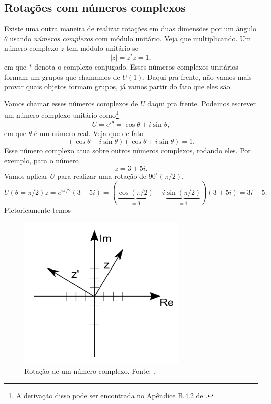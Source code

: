 \documentclass{article}
\numberwithin{equation}{section}
\numberwithin{figure}{section}
\begin{document}
\subsection{Rotações com números complexos}
Existe uma outra maneira de realizar rotações em duas dimensões por um ângulo $\theta$ usando \textit{números complexos} com módulo unitário. Veja que multiplicando. Um número complexo $z$ tem módulo unitário se 
\begin{equation}
	|z|=z^*z=1,
\end{equation}
em que $*$ denota o complexo conjugado. Esses números complexos unitários formam um grupos que chamamos de $U(1)$. Daqui pra frente, não vamos mais provar quais objetos formam grupos, já vamos partir do fato que eles são. 

Vamos chamar esses números complexos de $U$ daqui pra frente. Podemos escrever um número complexo unitário como\footnote{A derivação disso pode ser encontrada no Apêndice B.4.2 de \cite{jakob}.}
\begin{equation}
	U=e^{i\theta}=\cos\theta+i\sin\theta, 
\end{equation}
em que $\theta$ é um número real. Veja que de fato
\begin{equation}
	(\cos\theta-i\sin\theta)(\cos\theta+i\sin\theta)=1.
\end{equation}
Esse número complexo atua sobre outros números complexos, rodando eles. Por exemplo, para o número 
\begin{equation*}
	z=3+5i. 
\end{equation*}
Vamos aplicar $U$ para realizar uma rotação de $90^{\circ}(\pi/2)$, 
\begin{equation}
	U(\theta=\pi/2)z=e^{i\pi/2}(3+5i)=(\underbrace{\cos(\pi/2)}_{=0}+i\underbrace{\sin(\pi/2)}_{=1})(3+5i)=3i-5. 
\end{equation}
Pictoricamente temos 
\begin{figure}[H]
	\centering
	\includegraphics[scale=0.5]{figures/rotacao_numero_complexo.png}
	\caption{Rotação de um número complexo. Fonte: \cite{jakob}.}
\end{figure}
\end{document}

